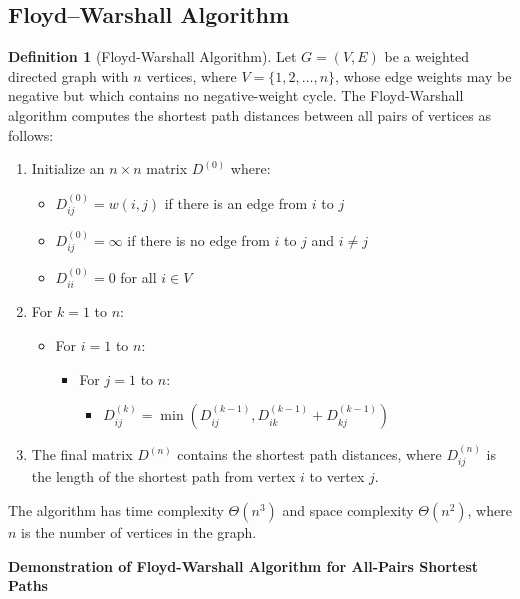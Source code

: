 \documentclass{article}
\theoremstyle{definition}
\newtheorem{definition}{Definition}
\begin{document}
\subsection{Floyd–Warshall Algorithm}
\begin{definition}[Floyd-Warshall Algorithm]
Let $G = (V, E)$ be a weighted directed graph with $n$ vertices, where $V = \{1, 2, \ldots, n\}$, whose edge weights may be negative but which contains no negative-weight cycle. The Floyd-Warshall algorithm computes the shortest path distances between all pairs of vertices as follows:

\begin{enumerate}
\item Initialize an $n \times n$ matrix $D^{(0)}$ where:
   \begin{itemize}
   \item $D^{(0)}_{ij} = w(i,j)$ if there is an edge from $i$ to $j$
   \item $D^{(0)}_{ij} = \infty$ if there is no edge from $i$ to $j$ and $i \neq j$
   \item $D^{(0)}_{ii} = 0$ for all $i \in V$
   \end{itemize}

\item For $k = 1$ to $n$:
   \begin{itemize}
   \item For $i = 1$ to $n$:
      \begin{itemize}
      \item For $j = 1$ to $n$:
         \begin{itemize}
         \item $D^{(k)}_{ij} = \min(D^{(k-1)}_{ij}, D^{(k-1)}_{ik} + D^{(k-1)}_{kj})$
         \end{itemize}
      \end{itemize}
   \end{itemize}

\item The final matrix $D^{(n)}$ contains the shortest path distances, where $D^{(n)}_{ij}$ is the length of the shortest path from vertex $i$ to vertex $j$.
\end{enumerate}

The algorithm has time complexity $\Theta(n^3)$ and space complexity $\Theta(n^2)$, where $n$ is the number of vertices in the graph.
\end{definition}

\noindent\textbf{Demonstration of Floyd-Warshall Algorithm for All-Pairs Shortest Paths}
\end{document}
